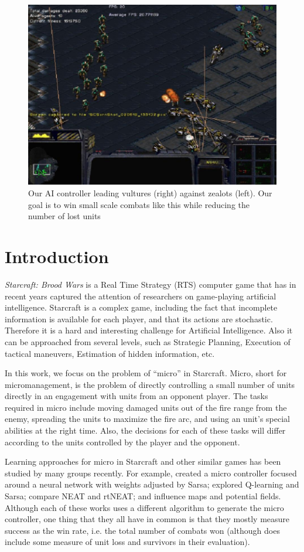 \begin{figure}
  \includegraphics[width=.45\textwidth]{figures/vultures_vs_zealots_combat}
  \caption{Our AI controller leading vultures (right) against zealots
    (left). Our goal is to win small scale combats like this while
    reducing the number of lost units}
    \label{fig:combat-example}
\end{figure}

\section{Introduction}\label{section:introduction}

\emph{Starcraft: Brood Wars} is a Real Time Strategy (RTS) computer
game that has in recent years captured the attention of researchers on
game-playing artificial intelligence. Starcraft is a complex game,
including the fact that incomplete information is available for each
player, and that its actions are stochastic. Therefore it is a hard
and interesting challenge for Artificial Intelligence. Also it can be
approached from several levels, such as Strategic Planning, Execution
of tactical maneuvers, Estimation of hidden information, etc.

In this work, we focus on the problem of ``micro'' in
Starcraft. Micro, short for micromanagement, is the problem of
directly controlling a small number of units directly in an engagement
with units from an opponent player. The tasks required in micro
include moving damaged units out of the fire range from the enemy,
spreading the units to maximize the fire arc, and using an unit's
special abilities at the right time. Also, the decisions for each of
these tasks will differ according to the units controlled by the
player and the opponent.

Learning approaches for micro in Starcraft and other similar games has
been studied by many groups recently. For example, \citet{Shantia11ConnectionistSC}
created a micro controller focused
around a neural network with weights adjusted by Sarsa;
\citet{Wender12ReinforcementMicroSC} explored Q-learning and Sarsa;
\citet{Zhen13NeuroEvoSC} compare NEAT and rtNEAT; and \citet{Liu14EffectiveMicro}
influence maps and potential fields.  Although each of these works uses a different
algorithm to generate the micro controller, one thing that they all
have in common is that they mostly measure success as the win rate,
i.e. the total number of combats won (although \citet{Liu14EffectiveMicro} does include
some measure of unit loss and survivors in their evaluation).

